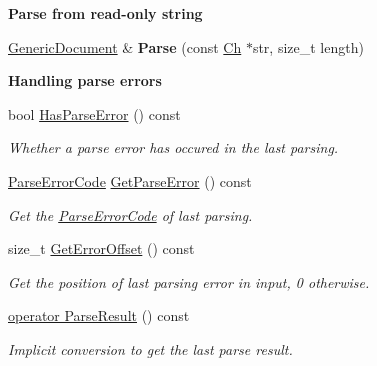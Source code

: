 \begin{Indent}{\bf Parse from read-\/only string}
\begin{DoxyCompactItemize}
\item 
\hyperlink{classGenericDocument}{Generic\+Document} \& {\bfseries Parse} (const \hyperlink{classGenericValue_ade0e0ce64ccd5d852da57a35e720bafb}{Ch} $\ast$str, size\+\_\+t length)\hypertarget{classGenericDocument_ab13d8358acc0648e3f91f6b825365e4f}{}\label{classGenericDocument_ab13d8358acc0648e3f91f6b825365e4f}

\end{DoxyCompactItemize}
\end{Indent}
\begin{Indent}{\bf Handling parse errors}\par
\begin{DoxyCompactItemize}
\item 
bool \hyperlink{classGenericDocument_afe0c87d9fc13a78597360e0646479419}{Has\+Parse\+Error} () const \hypertarget{classGenericDocument_afe0c87d9fc13a78597360e0646479419}{}\label{classGenericDocument_afe0c87d9fc13a78597360e0646479419}

\begin{DoxyCompactList}\small\item\em Whether a parse error has occured in the last parsing. \end{DoxyCompactList}\item 
\hyperlink{group__RAPIDJSON__ERRORS_ga8d4b32dfc45840bca189ade2bbcb6ba7}{Parse\+Error\+Code} \hyperlink{classGenericDocument_aab4771355aa3c6e5368da3ae36f38cc1}{Get\+Parse\+Error} () const \hypertarget{classGenericDocument_aab4771355aa3c6e5368da3ae36f38cc1}{}\label{classGenericDocument_aab4771355aa3c6e5368da3ae36f38cc1}

\begin{DoxyCompactList}\small\item\em Get the \hyperlink{group__RAPIDJSON__ERRORS_ga8d4b32dfc45840bca189ade2bbcb6ba7}{Parse\+Error\+Code} of last parsing. \end{DoxyCompactList}\item 
size\+\_\+t \hyperlink{classGenericDocument_a2db6ad11d157342f725470fb898b6712}{Get\+Error\+Offset} () const \hypertarget{classGenericDocument_a2db6ad11d157342f725470fb898b6712}{}\label{classGenericDocument_a2db6ad11d157342f725470fb898b6712}

\begin{DoxyCompactList}\small\item\em Get the position of last parsing error in input, 0 otherwise. \end{DoxyCompactList}\item 
\hyperlink{classGenericDocument_a12ce1db7b06e2565b6abb2112a681c71}{operator Parse\+Result} () const 
\begin{DoxyCompactList}\small\item\em Implicit conversion to get the last parse result. \end{DoxyCompactList}\end{DoxyCompactItemize}
\end{Indent}
